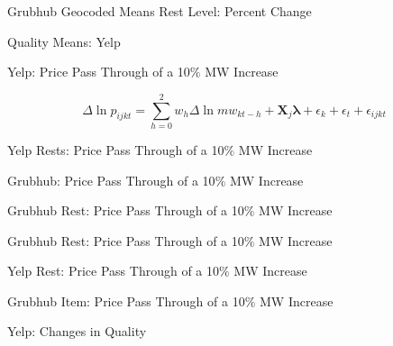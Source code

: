 \documentclass[xcolor=table]{beamer}
\newcommand\Wider[2][4em]{%
\makebox[\linewidth][c]{%
  \begin{minipage}{\dimexpr\textwidth+#1\relax}
  \raggedright#2
  \end{minipage}%
  }%
}
\begin{document}
\begin{spacing}{1.2}
\begin{frame}{Grubhub Geocoded Means Rest Level: Percent Change}
\end{frame}

\begin{frame}{Quality Means: Yelp}
\centering
\tiny


\end{frame}

\begin{frame}{Yelp: Price Pass Through of a 10$\%$ MW Increase}
\Wider{

\centering
\tiny

}

\footnotesize
\begin{dmath}
\Delta \ln p_{ijkt} = \sum_{h=0}^{2}w_h \Delta \ln mw_{kt-h}  + \boldsymbol{X}_j \boldsymbol{\lambda} + \epsilon_k + \epsilon_t + \epsilon_{ijkt}
\end{dmath}

\end{frame}

\begin{frame}{Yelp Rests: Price Pass Through of a 10$\%$ MW Increase}
\Wider{
\centering
\tiny

}
\end{frame}

\begin{frame}{Grubhub: Price Pass Through of a 10$\%$ MW Increase}
\Wider{
\centering
\tiny

}
\end{frame}

\begin{frame}{Grubhub Rest: Price Pass Through of a 10$\%$ MW Increase}
\Wider{
\centering
\tiny

}
\end{frame}

\begin{frame}{Grubhub Rest: Price Pass Through of a 10$\%$ MW Increase}
\Wider{
\centering
\tiny

}
\end{frame}

\begin{frame}{Yelp Rest: Price Pass Through of a 10$\%$ MW Increase}
\Wider{
\centering
\tiny

}
\end{frame}

\begin{frame}{Grubhub Item: Price Pass Through of a 10$\%$ MW Increase}
\Wider{
\centering
\tiny

}
\end{frame}

\begin{frame}{Yelp: Changes in Quality}
\Wider{
\centering
\tiny

}
\end{frame}




\end{spacing}
\end{document}

